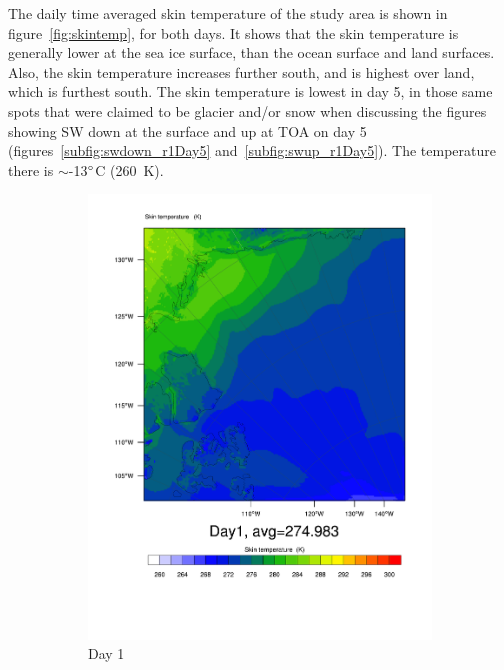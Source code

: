 The daily time averaged skin temperature of the study area is shown in figure~\ref{fig:skintemp}, for both days. It shows that the skin temperature is generally lower at the sea ice surface, than the ocean surface and land surfaces. Also, the skin temperature increases further south, and is highest over land, which is furthest south. The skin temperature is lowest in day 5, in those same spots that were claimed to be glacier and/or snow when discussing the figures showing SW down at the surface and up at TOA on day 5 (figures~\ref{subfig:swdown_r1Day5} and~\ref{subfig:swup_r1Day5}). The temperature there is $\sim$-13$\degree$C (260~K).
\begin{figure}
	\begin{subfigure}{0.48\textwidth}
		\centering
		\includegraphics[width=\textwidth]{results/control/skintemp_day1.pdf}
		\caption{Day 1}
		\label{subfig:skin_r1Day1}
	\end{subfigure}
	\begin{subfigure}{0.48\textwidth}

\end{subfigure}
\end{figure}
